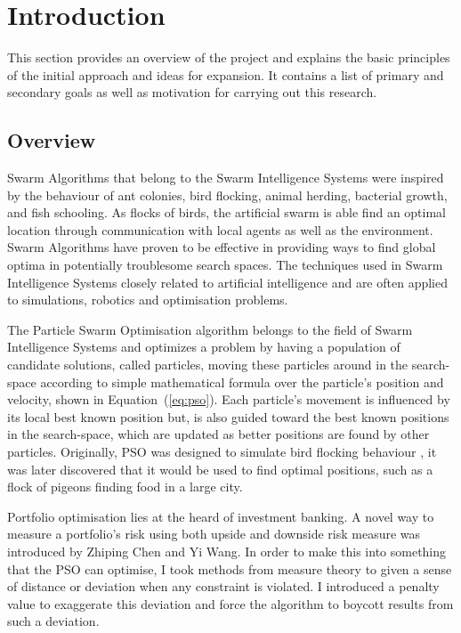 \chapter{Introduction\label{chap:intro}}
This section provides an overview of the project and explains the basic principles of the initial approach and ideas for expansion. It contains a list of primary and secondary goals as well as motivation for carrying out this research.

  \section{Overview} %
  \label{sec:overview}
  Swarm Algorithms that belong to the Swarm Intelligence Systems were inspired by the behaviour of ant colonies, bird flocking, animal herding, bacterial growth, and fish schooling. As flocks of birds, the artificial swarm is able find an optimal location through communication with local agents as well as the environment. Swarm Algorithms have proven to be effective in providing ways to find global optima in potentially troublesome search spaces. The techniques used in Swarm Intelligence Systems closely related to artificial intelligence and are often applied to simulations, robotics and optimisation problems. 

  The Particle Swarm Optimisation algorithm belongs to the field of Swarm Intelligence Systems and optimizes a problem by having a population of candidate solutions, called particles, moving these particles around in the search-space according to simple mathematical formula over the particle's position and velocity, shown in Equation~(\ref{eq:pso}). Each particle's movement is influenced by its local best known position but, is also guided toward the best known positions in the search-space, which are updated as better positions are found by other particles. Originally, PSO was designed to simulate bird flocking behaviour \cite{pso}, it was later discovered that it would be used to find optimal positions, such as a flock of pigeons finding food in a large city.

  Portfolio optimisation lies at the heard of investment banking. A novel way to measure a portfolio's risk using both upside and downside risk measure was introduced by Zhiping Chen and Yi Wang. In order to make this into something that the PSO can optimise, I took methods from measure theory to given a sense of distance or deviation when any constraint is violated. I introduced a penalty value to exaggerate this deviation and force the algorithm to boycott results from such a deviation.

